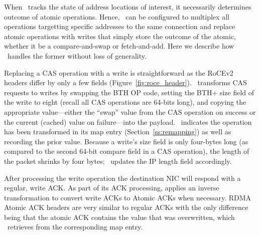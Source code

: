 When \sword\ tracks the state of address locations of interest, it
necessarily determines outcome of atomic operations.  Hence,
\sword\ can be configured to multiplex all operations targetting
specific addresses to the same connection and replace atomic
operations with writes that simply store the outcome of the atomic,
whether it be a compare-and-swap or fetch-and-add.  Here we describe
how \sword\ handles the former without loss of generality.

Replacing a CAS operation with a write is straightforward as the
RoCEv2 headers differ by only a few fields
(Figure~\ref{fig:roce_header}).  \sword\ transforms CAS requests to
writes by swapping the BTH OP code, setting the BTH+ size field of the
write to eight (recall all CAS operations are 64-bits long), and
copying the appropriate value---either the ``swap'' value from the CAS
operation on success or the current (cached) value on failure---into
the payload.  \sword\ indicates the operation has been transformed in
its map entry (Section~\ref{ss:remapping}) as well as recording the prior value.
Because a write's size field is only four-bytes long (as compared to
the second 64-bit compare field in a CAS operation), the length of the
packet shrinks by four bytes; \sword\ updates the IP length field
accordingly.



After processing the write operation the destination NIC will respond
with a regular, write ACK. As part of its ACK processing, {\sword}
applies an inverse transformation to convert write ACKs to Atomic ACKs
when necessary.  RDMA Atomic ACK headers are very similar to regular
ACKs with the only difference being that the atomic ACK contains the
value that was overwritten, which \sword\ retrieves from the
corresponding map entry.


